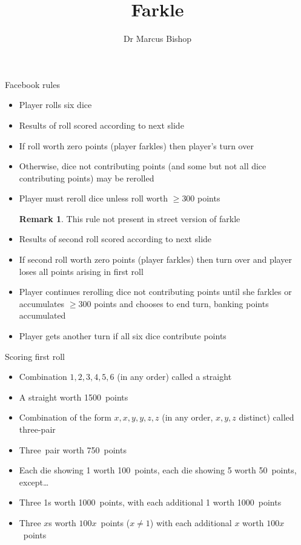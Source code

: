\documentclass{beamer}
\title[Farkle]{Farkle}
\author{Dr Marcus Bishop}
\theoremstyle{definition}
\newtheorem{remark}{Remark}
\begin{document}
\begin{frame}\titlepage\end{frame}
\LogoOff

\begin{frame}{Facebook rules}
\begin{itemize}
\item Player rolls six dice
\item Results of roll scored according to next slide
\item If roll worth zero points (player \alert{farkles})
then player's turn over
\item Otherwise, dice not contributing points 
(and some but not all dice contributing points) \alert{may}
be rerolled
\item Player \alert{must} reroll dice
unless roll worth $\ge 300$ points
\begin{remark}
This rule not present in street version of farkle
\end{remark}
\item Results of second roll scored according to next slide
\item If second roll worth zero points
(player \alert{farkles}) then turn over and
player loses all points arising in first roll
\item Player continues rerolling dice not contributing
points until she farkles or accumulates $\ge 300$ points and
chooses to end turn, banking points accumulated
\item Player gets another turn if all six
dice contribute points
\end{itemize}
\end{frame}

\begin{frame}{Scoring first roll}
\begin{itemize}
\item Combination $1,2,3,4,5,6$
(in any order) called a \alert{straight}
\item A straight worth 1500~points
\item Combination of the form $x,x,y,y,z,z$
(in any order, $x,y,z$ distinct) called \alert{three-pair}
\item Three~pair worth 750~points
\item Each die showing 1 worth 100~points, each die showing 5 worth 50~points,
except\dots
\item Three 1s worth 1000~points, with each additional
1 worth 1000~points
\item Three $x$s worth $100x$~points ($x\ne 1$)
with each additional $x$ worth $100x$~points
\end{itemize}
\end{frame}
\end{document}
